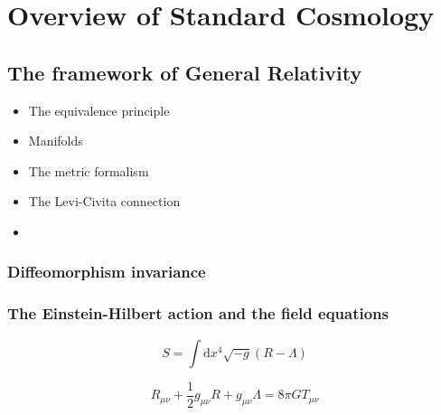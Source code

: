 
\chapter{Overview of Standard Cosmology} %

\label{Overview} %


\newcommand{\keyword}[1]{\textbf{#1}}
\newcommand{\tabhead}[1]{\textbf{#1}}
\newcommand{\code}[1]{\texttt{#1}}
\newcommand{\file}[1]{\texttt{\bfseries#1}}
\newcommand{\option}[1]{\texttt{\itshape#1}}


\section{The framework of General Relativity}

\begin{itemize}
\item The equivalence principle
\item Manifolds
\item The metric formalism
\item The Levi-Civita connection
\item 
\end{itemize}

\subsection{Diffeomorphism invariance}

\subsection{The Einstein-Hilbert action and the field equations}

\begin{equation}
S = \int \textrm{d}x^4 \sqrt{-g}( R - \Lambda)
\end{equation}

\begin{equation}
R_{\mu \nu} + \frac{1}{2}g_{\mu \nu} R + g_{\mu \nu} \Lambda = 8 \pi G T_{\mu \nu}
\end{equation}

